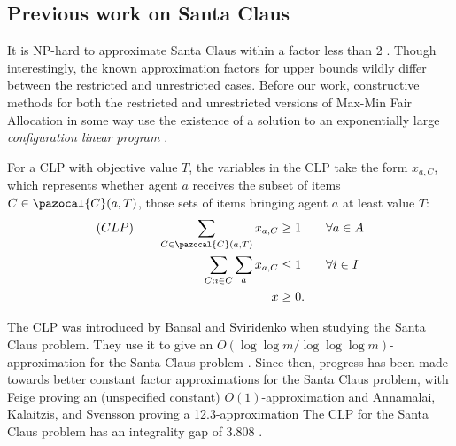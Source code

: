 \subsection{Previous work on Santa Claus}


It is NP-hard to approximate Santa Claus within 
a factor less than 2 \cite{BezakovaD05}. 
Though interestingly, the known approximation factors for upper bounds wildly differ between the 
restricted and unrestricted cases. 
Before our work, constructive methods for both the restricted and unrestricted versions of 
Max-Min Fair Allocation in some way use the existence of a solution to an exponentially large
\textit{configuration linear program}  \cite{SantaClaus-BansalSviridenko-STOC2006, AlgoForSantaClaus-AnnamalaiKalaitzisSvenssonSODA15, AS10, MaxMinFairAllocation-ChakrabartyChuzhoyKhannaFOCS09, ChengM18}.
 
For a CLP with objective value $T$, 
the variables in the CLP take the form $x_{a,C}$, 
which represents whether agent $a$ receives the subset of items $C \in  \pazocal{C}(a,T)$, 
those sets of items bringing agent $a$ at least value $T$:
\begin{align*}(CLP) \qquad
\sum_{C \in \pazocal{C}(a,T)} x_{a,C} &\geq 1  \qquad \forall a \in A \\
\sum_{C: i \in C} \sum_{a} x_{a,C} &\leq 1 \qquad \forall i \in I \\ 
x &\geq 0.
\end{align*}

The CLP was introduced by Bansal and Sviridenko when studying the Santa Claus problem. 
They use it to give an $O(\log \log m / \log \log \log m)$- approximation for the Santa Claus problem  \cite{SantaClaus-BansalSviridenko-STOC2006}. 
Since then, progress has been made towards better constant factor approximations for the Santa Claus problem, 
with Feige proving an (unspecified constant) $O(1)$-approximation and Annamalai, Kalaitzis, and Svensson proving 
a 12.3-approximation \cite{ConstantIntegralityGapSantaClaus-Feige-SODA2008, AlgoForSantaClaus-AnnamalaiKalaitzisSvenssonSODA15}
The CLP for the Santa Claus problem has an integrality gap of $3.808$ \cite{CM19}. 

